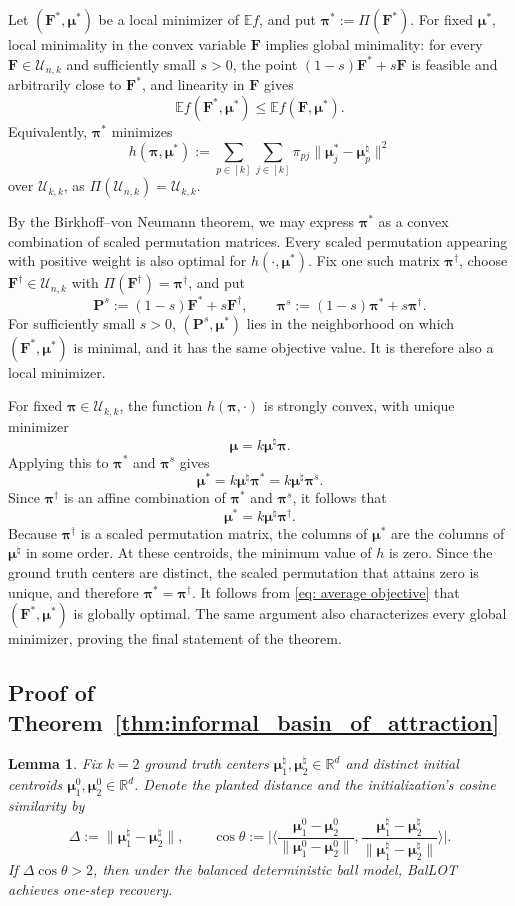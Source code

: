 \documentclass{article}
\theoremstyle{plain}
\newtheorem{lemma}[theorem]{Lemma}
\theoremstyle{definition}
\newcommand{\1}{\mathbf{1}}
\newcommand{\hmu}{\bm{\mu}^\natural}
\newcommand{\bUnk}{\mathcal{U}_{n,k}}
\newcommand{\bUkk}{\mathcal{U}_{k,k}}
\newcommand{\bmF}{\bm{F}}
\newcommand{\bmu}{\bm{\mu}}
\newcommand{\bmpi}{\bm{\pi}}
\begin{document}
Let $(\bm{F}^*, \bmu^*)$ be a local minimizer of $\mathbb{E}f$, and put $\bmpi^*:=\Pi(\bmF^*)$.
For fixed $\bmu^*$, local minimality in the convex variable $\bmF$ implies global minimality: for every $\bmF\in\bUnk$ and sufficiently small $s>0$, the point $(1-s)\bmF^*+s\bmF$ is feasible and arbitrarily close to $\bmF^*$, and linearity in $\bmF$ gives
\[
\mathbb{E}f(\bmF^*,\bmu^*)\leq\mathbb{E}f(\bmF,\bmu^*).
\]
Equivalently, $\bmpi^*$ minimizes
\[
h(\bmpi,\bmu^*):=\sum_{p\in[k]}\sum_{j\in[k]}\pi_{pj}\|\bmu_j^*-\hmu_p\|^2
\]
over $\bUkk$, as $\Pi(\bUnk) = \bUkk$.

By the Birkhoff--von Neumann theorem, we may express $\bmpi^*$ as a convex combination of scaled permutation matrices.
Every scaled permutation appearing with positive weight is also optimal for $h(\cdot,\bmu^*)$.
Fix one such matrix $\bmpi^\dagger$, choose $\bmF^\dagger\in\bUnk$ with $\Pi(\bmF^\dagger)=\bmpi^\dagger$, and put
\[
\bm{P}^s:=(1-s)\bmF^*+s\bmF^\dagger,
\qquad
\bmpi^s:=(1-s)\bmpi^*+s\bmpi^\dagger.
\]
For sufficiently small $s>0$, $(\bm{P}^s,\bmu^*)$ lies in the neighborhood on which $(\bmF^*,\bmu^*)$ is minimal, and it has the same objective value.
It is therefore also a local minimizer.

For fixed $\bmpi\in\bUkk$, the function $h(\bmpi,\cdot)$ is strongly convex, with unique minimizer
\[
\bmu=k\hmu\bmpi.
\]
Applying this to $\bmpi^*$ and $\bmpi^s$ gives
\[
\bmu^*=k\hmu\bmpi^*=k\hmu\bmpi^s.
\]
Since $\bmpi^\dagger$ is an affine combination of $\bmpi^*$ and $\bmpi^s$, it follows that
\[
\bmu^*=k\hmu\bmpi^\dagger.
\]
Because $\bmpi^\dagger$ is a scaled permutation matrix, the columns of $\bmu^*$ are the columns of $\hmu$ in some order.
At these centroids, the minimum value of $h$ is zero.
Since the ground truth centers are distinct, the scaled permutation that attains zero is unique, and therefore $\bmpi^*=\bmpi^\dagger$.
It follows from \eqref{eq: average objective} that $(\bmF^*,\bmu^*)$ is globally optimal.
The same argument also characterizes every global minimizer, proving the final statement of the theorem.

\subsection{Proof of Theorem~\ref{thm:informal_basin_of_attraction}}
\label{sec: basin of attraction}

\begin{lemma}
\label{lem.delta cos theta}
Fix $k=2$ ground truth centers $\bmu^\natural_1,\bmu^\natural_2\in\mathbb{R}^d$ and distinct initial centroids $\bmu_1^0,\bmu_2^0\in\mathbb{R}^d$.
Denote the planted distance and the initialization's cosine similarity by
\[
\Delta:=\|\bmu^{\natural}_1-\bmu^{\natural}_2\|,
\qquad
\cos\theta:=\bigg|\bigg\langle
\frac{\bmu_1^0-\bmu_2^0}{\|\bmu_1^0-\bmu_2^0\|},
\frac{\bmu^{\natural}_1-\bmu^{\natural}_2}{\|\bmu^{\natural}_1-\bmu^{\natural}_2\|}
\bigg\rangle\bigg|.
\]
If $\Delta\cos\theta>2$, then under the balanced deterministic ball model, BalLOT achieves one-step recovery.
\end{lemma}
\end{document}
